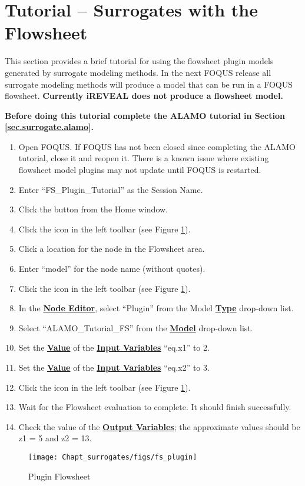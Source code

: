 \section{Tutorial -- Surrogates with the Flowsheet}\label{tutorial.surrogate.fs}

This section provides a brief tutorial for using the flowsheet plugin models generated by surrogate modeling methods. In the next FOQUS release all surrogate modeling methods will produce a model that can be run in a FOQUS flowsheet. \textbf{Currently iREVEAL does not produce a flowsheet model.}

\textbf{Before doing this tutorial complete the ALAMO tutorial in Section \ref{sec.surrogate.alamo}.}

\begin{enumerate}
	\item Open FOQUS.  If FOQUS has not been closed since completing the ALAMO tutorial, close it and reopen it. There is a known issue where existing flowsheet model plugins may not update until FOQUS is restarted.
	\item Enter ``FS\_Plugin\_Tutorial'' as the Session Name.
	\item Click the  button from the Home window.
	\item Click the  icon in the left toolbar (see Figure \ref{fig.pg.tut1}).
	\item Click a location for the node in the Flowsheet area.
	\item Enter ``model'' for the node name (without quotes).
	\item Click the  icon in the left toolbar (see Figure \ref{fig.pg.tut1}).
	\item In the \textbf{\underline{Node Editor}}, select ``Plugin'' from the Model \textbf{\underline{Type}} drop-down list. 
	\item Select ``ALAMO\_Tutorial\_FS'' from the \textbf{\underline{Model}} drop-down list. 
	\item Set the \textbf{\underline{Value}} of the \textbf{\underline{Input Variables}} ``eq.x1'' to 2.
	\item Set the \textbf{\underline{Value}} of the \textbf{\underline{Input Variables}} ``eq.x2'' to 3.
	\item Click the  icon in the left toolbar (see Figure \ref{fig.pg.tut1}).
	\item Wait for the Flowsheet evaluation to complete. It should finish successfully.
	\item Check the value of the \textbf{\underline{Output Variables}}; the approximate values should be z1 = 5 and z2 = 13.
\end{enumerate}

\begin{figure}[H]
	\begin{center}
		\texttt{[image: Chapt\_surrogates/figs/fs\_plugin]}
		\caption{Plugin Flowsheet}
		\label{fig.pg.tut1}
	\end{center}
\end{figure}
